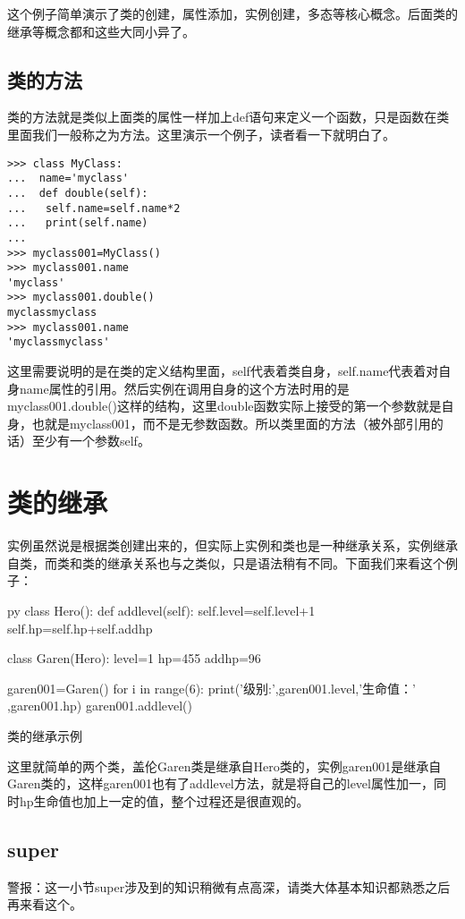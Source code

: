 \documentclass[12pt,oneside]{book}
\begin{document}
\begin{common-format}
这个例子简单演示了类的创建，属性添加，实例创建，多态等核心概念。后面类的继承等概念都和这些大同小异了。


\subsection{类的方法}
类的方法就是类似上面类的属性一样加上def语句来定义一个函数，只是函数在类里面我们一般称之为方法。这里演示一个例子，读者看一下就明白了。
\begin{Verbatim}
>>> class MyClass:
...  name='myclass'
...  def double(self):
...   self.name=self.name*2
...   print(self.name)
... 
>>> myclass001=MyClass()
>>> myclass001.name
'myclass'
>>> myclass001.double()
myclassmyclass
>>> myclass001.name
'myclassmyclass'
\end{Verbatim}

这里需要说明的是在类的定义结构里面，self代表着类自身，self.name代表着对自身name属性的引用。然后实例在调用自身的这个方法时用的是myclass001.double()这样的结构，这里double函数实际上接受的第一个参数就是自身，也就是myclass001，而不是无参数函数。所以类里面的方法（被外部引用的话）至少有一个参数self。





\section{类的继承}
实例虽然说是根据类创建出来的，但实际上实例和类也是一种继承关系，实例继承自类，而类和类的继承关系也与之类似，只是语法稍有不同。下面我们来看这个例子：
\begin{xverbatim}[129]{py}
class Hero():
    def addlevel(self):
        self.level=self.level+1
        self.hp=self.hp+self.addhp

class Garen(Hero):
    level=1
    hp=455
    addhp=96

garen001=Garen()
for i in range(6):
    print('级别:',garen001.level,'生命值：' ,garen001.hp)
    garen001.addlevel()
\end{xverbatim}

\begin{fig}[0.5]{类的继承示例}
\caption{类的继承示例}
\label{fig:类的继承示例}
\end{fig}

这里就简单的两个类，盖伦Garen类是继承自Hero类的，实例garen001是继承自Garen类的，这样garen001也有了addlevel方法，就是将自己的level属性加一，同时hp生命值也加上一定的值，整个过程还是很直观的。

\subsection{super}
\begin{flushright}
\begin{notecard}[red!30]{16em}
警报：这一小节super涉及到的知识稍微有点高深，请类大体基本知识都熟悉之后再来看这个。 
\end{notecard}
\end{flushright}


\end{common-format}
\end{document}
